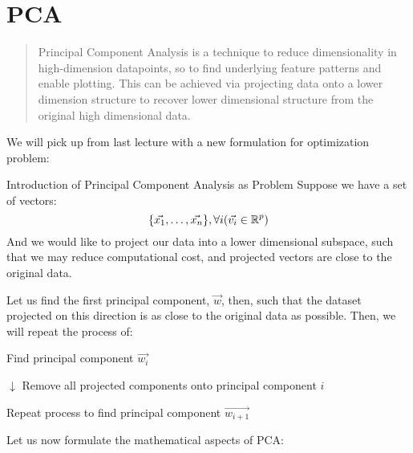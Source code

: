 \section{PCA}
\begin{quote}
    Principal Component Analysis is a technique to reduce dimensionality in high-dimension datapoints, so to find underlying feature patterns and enable plotting.
    This can be achieved via projecting data onto a lower dimension structure to recover lower dimensional structure from the original high dimensional data. \\
\end{quote}
We will pick up from last lecture with a new formulation for optimization problem:
\begin{ln-explain}{Introduction of Principal Component Analysis as Problem}{}
    Suppose we have a set of vectors:
    \[
        \{\vec{x_1}, \dots, \vec{x_n}\}, \forall i (\vec{v_i} \in \mathbb{R}^p)
    \]
    And we would like to project our data into a lower dimensional subspace, such that we may reduce computational cost, and projected vectors are close to the original data.
\end{ln-explain}
Let us find the first principal component, $\vec{w}$, then, such that the dataset projected on this direction is as close to the original data as possible. Then, we will repeat the process of:
\begin{bindenum}
    \item Find principal component $\vec{w_i}$
    \item[$\downarrow$] Remove all projected components onto principal component $i$
    \item Repeat process to find principal component $\vec{w_{i + 1}}$
\end{bindenum}
Let us now formulate the mathematical aspects of PCA:

